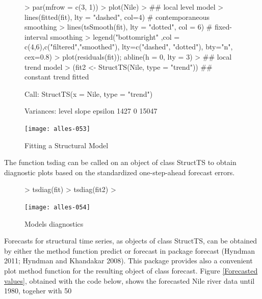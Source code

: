 \documentclass[11pt, a4paper]{article} %
\begin{document}
\begin{figure}
\centering
\begin{Schunk}
\begin{Sinput}
> par(mfrow = c(3, 1))
> plot(Nile)
> ## local level model
> lines(fitted(fit), lty = "dashed", col=4)       # contemporaneous smoothing
> lines(tsSmooth(fit), lty = "dotted", col = 6)   # fixed-interval smoothing
> legend("bottomright" ,col = c(4,6),c("filtered","smoothed"), lty=c("dashed", "dotted"), bty="n", cex=0.8)
> plot(residuals(fit)); abline(h = 0, lty = 3)
> ## local trend model
> (fit2 <- StructTS(Nile, type = "trend")) ## constant trend fitted
\end{Sinput}
\begin{Soutput}
Call:
StructTS(x = Nile, type = "trend")

Variances:
  level    slope  epsilon  
   1427        0    15047  
\end{Soutput}
\end{Schunk}
\texttt{[image: alles-053]}
\caption{Fitting a Structural Model}
\end{figure}

\noindent The function tsdiag can be called on an object of class StructTS to obtain diagnostic plots based on the standardized one-step-ahead forecast errors.
\begin{figure}
\centering
\begin{Schunk}
\begin{Sinput}
> tsdiag(fit)
> tsdiag(fit2)
> 
\end{Sinput}
\end{Schunk}
\texttt{[image: alles-054]}
\caption{Models diagnostics}
\end{figure}

\noindent Forecasts for structural time series, as objects of class StructTS, can be obtained by either the method function predict or forecast in package forecast (Hyndman 2011; Hyndman and Khandakar 2008). This package provides also a convenient plot method function for the resulting object of class forecast. Figure \ref{Forecasted values}, obtained with the code below, shows the forecasted Nile river data until 1980, togeher with 50%
\end{document}
